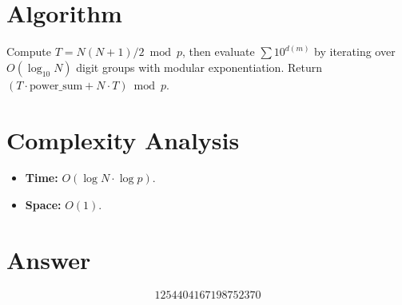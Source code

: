 \documentclass[11pt]{article}
\begin{document}
\section{Algorithm}

Compute $T=N(N+1)/2\bmod p$, then evaluate $\sum 10^{d(m)}$ by iterating over $O(\log_{10}N)$ digit groups with modular exponentiation. Return $(T\cdot\text{power\_sum}+N\cdot T)\bmod p$.

\section{Complexity Analysis}

\begin{itemize}
\item \textbf{Time:} $O(\log N\cdot\log p)$.
\item \textbf{Space:} $O(1)$.
\end{itemize}

\section{Answer}

\[
\boxed{1254404167198752370}
\]
\end{document}
